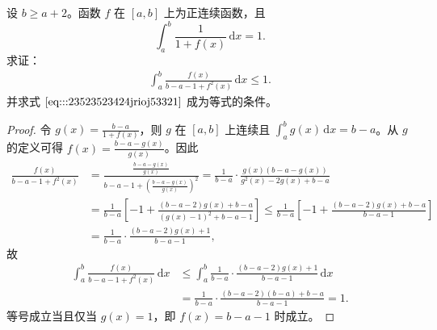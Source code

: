 \documentclass[../../main.tex]{subfiles}%
\begin{document}
\begin{example}
设 \( b \geqslant a + 2 \)。函数 \( f \) 在 \([a,b]\) 上为正连续函数，且
\[
\int_{a}^{b} \frac{1}{1 + f(x)} \, \mathrm{d}x = 1.
\]
求证：
\begin{align}
\int_{a}^{b} \frac{f(x)}{b - a - 1 + f^2(x)} \, \mathrm{d}x \leqslant 1. \label{eq:::23523523424jrioj53321}
\end{align}
并求式 \(\eqref{eq:::23523523424jrioj53321}\) 成为等式的条件。
\end{example}
\begin{proof}
令 \( g(x) = \frac{b - a}{1 + f(x)} \)，则 \( g \) 在 \([a,b]\) 上连续且 \( \int_{a}^{b} g(x) \, \mathrm{d}x = b - a \)。从 \( g \) 的定义可得 \( f(x) = \frac{b - a - g(x)}{g(x)} \)。因此
\begin{align*}
\frac{f(x)}{b-a-1+f^2(x)}&=\frac{\frac{b-a-g(x)}{g(x)}}{b-a-1+\left( \frac{b-a-g(x)}{g(x)} \right) ^2}=\frac{1}{b-a}\cdot \frac{g(x)(b-a-g(x))}{g^2(x)-2g(x)+b-a}
\\
&=\frac{1}{b-a}\left[ -1+\frac{(b-a-2)g(x)+b-a}{(g(x)-1)^2+b-a-1} \right] \leqslant \frac{1}{b-a}\left[ -1+\frac{(b-a-2)g(x)+b-a}{b-a-1} \right] 
\\
&=\frac{1}{b-a}\cdot \frac{(b-a-2)g(x)+1}{b-a-1},
\end{align*}
故
\begin{align*}
\int_a^b{\frac{f(x)}{b-a-1+f^2(x)}\,\mathrm{d}x}&\leqslant \int_a^b{\frac{1}{b-a}}\cdot \frac{(b-a-2)g(x)+1}{b-a-1}\,\mathrm{d}x
\\
&=\frac{1}{b-a}\cdot \frac{(b-a-2)(b-a)+b-a}{b-a-1}=1.
\end{align*}
等号成立当且仅当 \( g(x) = 1 \)，即 \( f(x) = b - a - 1 \) 时成立。
\end{proof}
\end{document}
